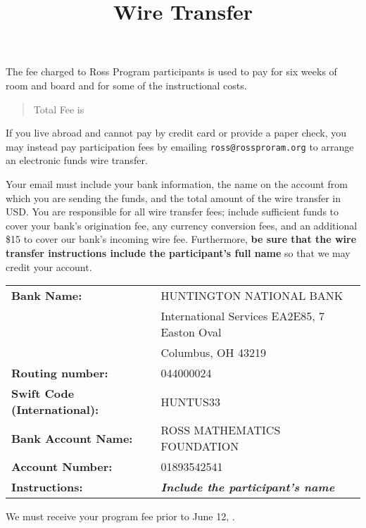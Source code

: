 \documentclass[11pt]{ross}
\title{Wire Transfer}
\begin{document}
\maketitle

The fee charged to Ross Program participants is used to pay for six
weeks of room and board and for some of the instructional costs.
\begin{quote}
Total Fee is \totalfee
\end{quote}

If you live abroad and cannot pay by credit card or provide a paper
check, you may instead pay participation fees by emailing
\texttt{ross@rossproram.org} to arrange an electronic funds wire
transfer.

Your email must include your bank information, the name on the account
from which you are sending the funds, and the total amount of the wire
transfer in USD.  You are responsible for all wire transfer fees;
include sufficient funds to cover your bank's origination fee, any
currency conversion fees, and an additional \$15 to cover our bank's
incoming wire fee.  Furthermore, \textbf{be sure that the wire
  transfer instructions include the participant's full name} so that
we may credit your account.

\begin{tabular}{ll}
  \textbf{Bank Name:} &  HUNTINGTON NATIONAL BANK \\
&  International Services EA2E85, 7 Easton Oval \\
&  Columbus, OH 43219   \\
\textbf{Routing number:} &  044000024 \\
\textbf{Swift Code (International):} & HUNTUS33 \\
\textbf{Bank Account Name:} & ROSS MATHEMATICS FOUNDATION \\
\textbf{Account Number:} &  01893542541 \\
  \textbf{Instructions:} &  \textit{\textbf{Include the participant's name}} \\
\end{tabular}

We must receive your program fee prior to June 12, \the\year.
\end{document}
